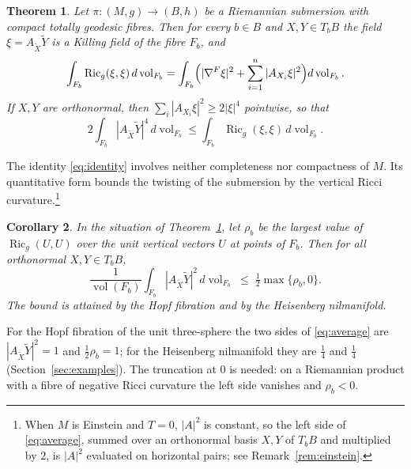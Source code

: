 \documentclass[11pt,reqno]{amsart}
\theoremstyle{plain}
\newtheorem{theorem}{Theorem}[section]
\newtheorem{corollary}[theorem]{Corollary}
\theoremstyle{definition}
\newcommand{\Ric}{\operatorname{Ric}}
\newcommand{\vol}{\operatorname{vol}}
\newcommand{\bas}[1]{\widetilde{#1}}
\begin{document}
\begin{theorem}\label{thm:identity}
Let $\pi\colon (M,g)\to(B,h)$ be a Riemannian submersion with compact totally geodesic fibres. Then for every $b\in B$ and $X,Y\in T_bB$ the field $\xi=A_{\bas X}\bas Y$ is a Killing field of the fibre $F_b$, and
\begin{equation}\label{eq:identity}
\int_{F_b}\Ric_g(\xi,\xi)\,d\vol_{F_b}=\int_{F_b}\Bigl(|\nabla^{F}\xi|^2+\sum_{i=1}^{n}|A_{X_i}\xi|^2\Bigr)d\vol_{F_b}.
\end{equation}
If $X,Y$ are orthonormal, then $\sum_i|A_{X_i}\xi|^2\ge2|\xi|^4$ pointwise, so that
\begin{equation}\label{eq:quartic}
2\int_{F_b}|A_{\bas X}\bas Y|^4\,d\vol_{F_b}\le\int_{F_b}\Ric_g(\xi,\xi)\,d\vol_{F_b}.
\end{equation}
\end{theorem}

The identity \eqref{eq:identity} involves neither completeness nor compactness of $M$. Its quantitative form bounds the twisting of the submersion by the vertical Ricci curvature.\footnote{When $M$ is Einstein and $T=0$, $|A|^2$ is constant, so the left side of \eqref{eq:average}, summed over an orthonormal basis $X,Y$ of $T_bB$ and multiplied by $2$, is $|A|^2$ evaluated on horizontal pairs; see Remark~\ref{rem:einstein}.}

\begin{corollary}\label{cor:average}
In the situation of Theorem~\ref{thm:identity}, let $\rho_b$ be the largest value of $\Ric_g(U,U)$ over the unit vertical vectors $U$ at points of $F_b$. Then for all orthonormal $X,Y\in T_bB$,
\begin{equation}\label{eq:average}
\frac{1}{\vol(F_b)}\int_{F_b}|A_{\bas X}\bas Y|^2\,d\vol_{F_b}\;\le\;\tfrac12\max\{\rho_b,0\} .
\end{equation}
The bound is attained by the Hopf fibration and by the Heisenberg nilmanifold.
\end{corollary}

For the Hopf fibration of the unit three-sphere the two sides of \eqref{eq:average} are $|A_{\bas X}\bas Y|^2=1$ and $\tfrac12\rho_b=1$; for the Heisenberg nilmanifold they are $\tfrac14$ and $\tfrac14$ (Section~\ref{sec:examples}). The truncation at $0$ is needed: on a Riemannian product with a fibre of negative Ricci curvature the left side vanishes and $\rho_b<0$.
\end{document}
